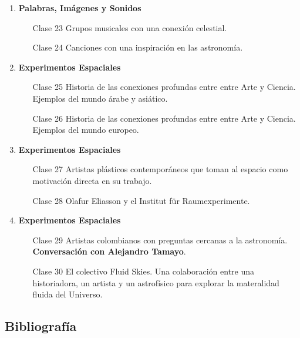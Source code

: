 \documentclass{report}
\begin{document}
\begin{enumerate}
\item {\bf Palabras, Im\'agenes y Sonidos}
\begin{itemize}
\item[Clase 23] Grupos musicales con una conexi\'on celestial.
\item[Clase 24] Canciones con una inspiraci\'on en las astronom\'ia. 
\end{itemize}

\item {\bf Experimentos Espaciales}
\begin{itemize}
\item[Clase 25] Historia de las conexiones profundas entre entre Arte
  y Ciencia. Ejemplos del mundo \'arabe y asi\'atico.
\item[Clase 26] Historia de las conexiones profundas entre entre Arte
  y Ciencia. Ejemplos del mundo europeo. 
\end{itemize}

\item {\bf Experimentos Espaciales}
\begin{itemize}
\item[Clase 27] Artistas pl\'asticos contempor\'aneos que toman al espacio como
  motivaci\'on directa en su trabajo.
\item[Clase 28] Olafur Eliasson y el Institut f\"ur Raumexperimente.
\end{itemize}

\item {\bf Experimentos Espaciales}
\begin{itemize}
\item[Clase 29] Artistas colombianos con preguntas cercanas a la
  astronom\'ia. {\bf Conversaci\'on con Alejandro Tamayo}.
\item[Clase 30] El colectivo Fluid Skies. Una colaboraci\'on entre una
  historiadora, un artista y un astrof\'isico para explorar la
  materalidad fluida del Universo.
\end{itemize}

\end{enumerate}



\subsection*{Bibliografía}
\end{document}
